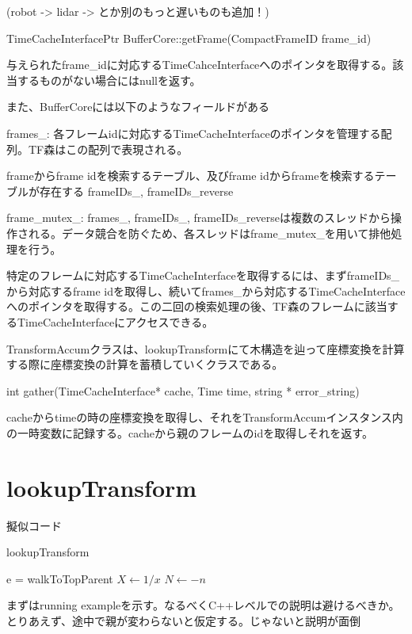 \documentclass[a4paper]{jreport}	%
\begin{document}
(robot -> lidar -> とか別のもっと遅いものも追加！)

TimeCacheInterfacePtr BufferCore::getFrame(CompactFrameID frame\_id)

与えられたframe\_idに対応するTimeCahceInterfaceへのポインタを取得する。該当するものがない場合にはnullを返す。

また、BufferCoreには以下のようなフィールドがある



frames\_: 各フレームidに対応するTimeCacheInterfaceのポインタを管理する配列。TF森はこの配列で表現される。




frameからframe idを検索するテーブル、及びframe idからframeを検索するテーブルが存在する frameIDs\_, frameIDs\_reverse

frame\_mutex\_: frames\_, frameIDs\_, frameIDs\_reverseは複数のスレッドから操作される。データ競合を防ぐため、各スレッドはframe\_mutex\_を用いて排他処理を行う。


特定のフレームに対応するTimeCacheInterfaceを取得するには、まずframeIDs\_から対応するframe idを取得し、続いてframes\_から対応するTimeCacheInterfaceへのポインタを取得する。この二回の検索処理の後、TF森のフレームに該当するTimeCacheInterfaceにアクセスできる。

TransformAccumクラスは、lookupTransformにて木構造を辿って座標変換を計算する際に座標変換の計算を蓄積していくクラスである。

int gather(TimeCacheInterface* cache, Time time, string * error\_string)

cacheからtimeの時の座標変換を取得し、それをTransformAccumインスタンス内の一時変数に記録する。cacheから親のフレームのidを取得しそれを返す。	

\section{lookupTransform}


擬似コード

\begin{algorithm}[H]
	\caption{lookupTransform}
	\begin{algorithmic}
	\STATE e = walkToTopParent
	\STATE $X \leftarrow 1 / x$
    \STATE $N \leftarrow -n$
    \ENDIF
	\end{algorithmic}
\end{algorithm}


まずはrunning exampleを示す。なるべくC++レベルでの説明は避けるべきか。
とりあえず、途中で親が変わらないと仮定する。じゃないと説明が面倒
\end{document}
